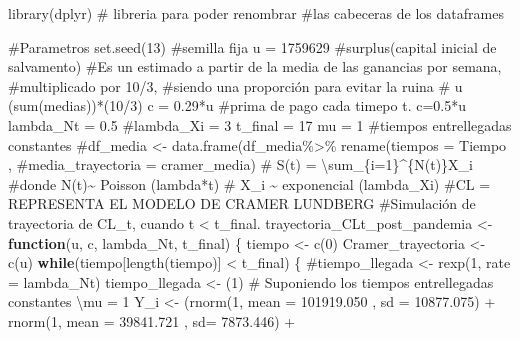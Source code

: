 \documentclass[
  us-letterpaper,
]{scrreprt}
\newenvironment{Shaded}{\begin{snugshade}}{\end{snugshade}}
\newcommand{\AttributeTok}[1]{\textcolor[rgb]{0.40,0.45,0.13}{#1}}
\newcommand{\CommentTok}[1]{\textcolor[rgb]{0.37,0.37,0.37}{#1}}
\newcommand{\ControlFlowTok}[1]{\textcolor[rgb]{0.00,0.23,0.31}{\textbf{#1}}}
\newcommand{\DecValTok}[1]{\textcolor[rgb]{0.68,0.00,0.00}{#1}}
\newcommand{\FloatTok}[1]{\textcolor[rgb]{0.68,0.00,0.00}{#1}}
\newcommand{\FunctionTok}[1]{\textcolor[rgb]{0.28,0.35,0.67}{#1}}
\newcommand{\NormalTok}[1]{\textcolor[rgb]{0.00,0.23,0.31}{#1}}
\newcommand{\OtherTok}[1]{\textcolor[rgb]{0.00,0.23,0.31}{#1}}
\newcommand{\SpecialCharTok}[1]{\textcolor[rgb]{0.37,0.37,0.37}{#1}}
\theoremstyle{definition}
\theoremstyle{plain}
\theoremstyle{plain}
\theoremstyle{remark}
\begin{document}
\begin{Shaded}
\begin{Highlighting}[]
\FunctionTok{library}\NormalTok{(dplyr) }\CommentTok{\# libreria para poder renombrar }
\CommentTok{\#las cabeceras de los dataframes}

\CommentTok{\#Parametros}
\FunctionTok{set.seed}\NormalTok{(}\DecValTok{13}\NormalTok{) }\CommentTok{\#semilla fija}
\NormalTok{u }\OtherTok{=} \DecValTok{1759629} \CommentTok{\#surplus(capital inicial de salvamento)}
\CommentTok{\#Es un estimado a partir de la media de las ganancias por semana, }
\CommentTok{\#multiplicado por 10/3, }
\CommentTok{\#siendo una proporción para evitar la ruina}
\CommentTok{\# u (sum(medias))*(10/3)}
\NormalTok{c }\OtherTok{=} \FloatTok{0.29}\SpecialCharTok{*}\NormalTok{u }\CommentTok{\#prima de pago cada timepo t. c=0.5*u}
\NormalTok{lambda\_Nt }\OtherTok{=} \FloatTok{0.5}
\CommentTok{\#lambda\_Xi = 3}
\NormalTok{t\_final }\OtherTok{=} \DecValTok{17}
\NormalTok{mu }\OtherTok{=} \DecValTok{1} \CommentTok{\#tiempos entrellegadas constantes}
\CommentTok{\#df\_media \textless{}{-} data.frame(df\_media\%\textgreater{}\% rename(tiempos = Tiempo , }
\CommentTok{\#media\_trayectoria = cramer\_media)}
\CommentTok{\# S(t) = \textbackslash{}sum\_\{i=1\}\^{}\{N(t)\}X\_i}
\CommentTok{\#donde N(t)\textasciitilde{} Poisson (lambda*t)}
\CommentTok{\# X\_i \textasciitilde{} exponencial (lambda\_Xi)}
\CommentTok{\#CL = REPRESENTA EL MODELO DE CRAMER LUNDBERG}
\CommentTok{\#Simulación de trayectoria de CL\_t, cuando t \textless{} t\_final.}
\NormalTok{trayectoria\_CLt\_post\_pandemia }\OtherTok{\textless{}{-}} \ControlFlowTok{function}\NormalTok{(u, c, lambda\_Nt, t\_final)}
\NormalTok{\{}
\NormalTok{  tiempo }\OtherTok{\textless{}{-}} \FunctionTok{c}\NormalTok{(}\DecValTok{0}\NormalTok{)}
\NormalTok{  Cramer\_trayectoria }\OtherTok{\textless{}{-}} \FunctionTok{c}\NormalTok{(u)}
  \ControlFlowTok{while}\NormalTok{(tiempo[}\FunctionTok{length}\NormalTok{(tiempo)] }\SpecialCharTok{\textless{}}\NormalTok{ t\_final)}
\NormalTok{  \{}
    \CommentTok{\#tiempo\_llegada \textless{}{-} rexp(1, rate = lambda\_Nt)}
\NormalTok{    tiempo\_llegada }\OtherTok{\textless{}{-}}\NormalTok{ (}\DecValTok{1}\NormalTok{) }
\CommentTok{\# Suponiendo los tiempos entrellegadas constantes \textbackslash{}mu = 1}
\NormalTok{    Y\_i }\OtherTok{\textless{}{-}}\NormalTok{  (}\FunctionTok{rnorm}\NormalTok{(}\DecValTok{1}\NormalTok{, }\AttributeTok{mean =} \FloatTok{101919.050}\NormalTok{ , }\AttributeTok{sd =} \FloatTok{10877.075}\NormalTok{)  }\SpecialCharTok{+} 
               \FunctionTok{rnorm}\NormalTok{(}\DecValTok{1}\NormalTok{, }\AttributeTok{mean =}  \FloatTok{39841.721}\NormalTok{ , }\AttributeTok{sd=} \FloatTok{7873.446}\NormalTok{)  }\SpecialCharTok{+}  

\end{Highlighting}
\end{Shaded}
\end{document}
